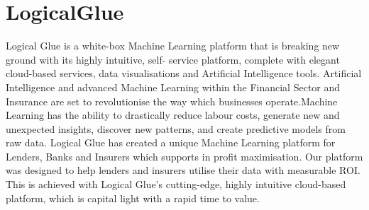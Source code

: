 \section{LogicalGlue}

Logical Glue \cite{logicalglue} is a white-box Machine Learning platform that is
breaking new ground with its highly intuitive, self- service platform, complete
with elegant cloud-based services, data visualisations and Artificial
Intelligence tools.  Artificial Intelligence and advanced Machine
Learning within the Financial Sector and Insurance are set to revolutionise the
way which businesses operate.Machine Learning has the ability to drastically
reduce labour costs, generate new and unexpected insights, discover new
patterns, and create predictive models from raw
data\cite{crunchbase_logicalblue}.  Logical Glue has created a unique Machine
Learning platform for Lenders, Banks and Insurers which supports in profit
maximisation. Our platform was designed to help lenders and insurers utilise
their data with measurable ROI. This is achieved with Logical Glue’s
cutting-edge, highly intuitive cloud-based platform, which is capital light with
a rapid time to value.
